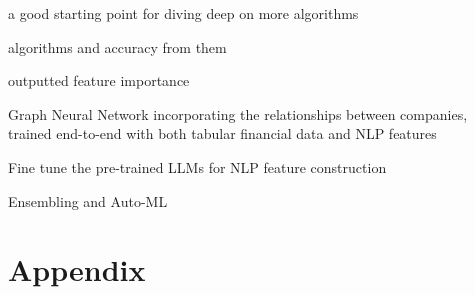 \documentclass{article}
\begin{document}
    a good starting point for diving deep on more algorithms

    algorithms and accuracy from them

    outputted feature importance

    Graph Neural Network incorporating the relationships between companies, trained end-to-end with both tabular financial data and NLP features
    
    Fine tune the pre-trained LLMs for NLP feature construction
    
    Ensembling and Auto-ML
    
    \clearpage
    \newpage

    
    

    \clearpage
    \newpage

    \appendix

    \section*{Appendix}
\end{document}
